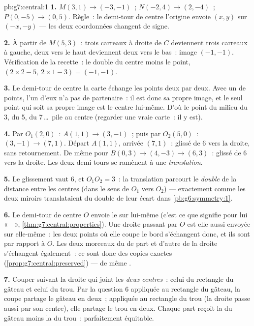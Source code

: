 \begin{solution}{pb:g7:central:1}
\textbf{1.} $M(3, 1) \to (-3, -1)$~; $N(-2, 4) \to (2, -4)$~;
$P(0, -5) \to (0, 5)$. Règle~: le demi-tour de centre l'origine
envoie $(x, y)$ sur $(-x, -y)$ --- les deux coordonnées changent de
signe.

\textbf{2.} À partir de $M(5, 3)$~: trois carreaux à droite de $C$
deviennent trois carreaux à gauche, deux vers le haut deviennent
deux vers le bas~: image $(-1, -1)$. Vérification de la recette~: le
double du centre moins le point,
$(2 \times 2 - 5,\ 2 \times 1 - 3) = (-1, -1)$.

\textbf{3.} Le demi-tour de centre la carte échange les points deux
par deux. Avec un  de points, l'un d'eux n'a pas de
partenaire~: il est donc sa propre image, et le seul point qui soit
sa propre image est le centre lui-même. D'où le point du milieu du
3, du 5, du 7\,\dots\ pile au centre (regarder une vraie carte~: il
y est).

\textbf{4.} Par $O_1(2,0)$~: $A(1,1) \to (3,-1)$~; puis par
$O_2(5,0)$~: $(3,-1) \to (7,1)$. Départ $A(1,1)$, arrivée
$(7,1)$~: glissé de $6$ vers la droite, sans retournement. De même
pour $B(0,3) \to (4,-3) \to (6,3)$~: glissé de $6$ vers la droite.
Les deux demi-tours se ramènent à une \emph{translation}.

\textbf{5.} Le glissement vaut $6$, et $O_1 O_2 = 3$~: la
translation parcourt le \emph{double} de la distance entre les
centres (dans le sens de $O_1$ vers $O_2$) --- exactement comme les
deux miroirs  translataient du double de leur écart dans
\cref{pb:g6:symmetry:1}.

\textbf{6.} Le demi-tour de centre $O$ envoie le  sur
lui-même (c'est ce que signifie pour lui «~~»,
\cref{thm:g7:central:properties}). Une droite passant par $O$ est
elle aussi envoyée sur elle-même~: les deux points où elle coupe le
bord s'échangent donc, et ils sont  par rapport à $O$.
Les deux morceaux du  de part et d'autre de la droite
s'échangent également~: ce sont donc des copies exactes
(\cref{prop:g7:central:preserved}) --- de même .

\textbf{7.} Couper suivant la droite qui joint les \emph{deux
centres}~: celui du rectangle du gâteau et celui du trou. Par la
question 6 appliquée au rectangle du gâteau, la coupe partage le
gâteau en deux~; appliquée au rectangle du trou (la droite passe
aussi par son centre), elle partage le trou en deux. Chaque part
reçoit la  du gâteau moins la  du trou~: parfaitement
équitable.


\end{solution}
